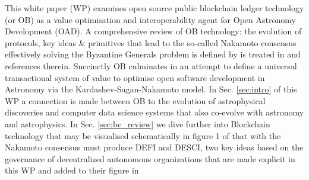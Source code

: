 \documentclass[final,5p,times,twocolumn,authoryear]{elsarticle}
\begin{document}
This white paper (WP) examines open source public blockchain ledger technology (or OB) as a value optimisation and interoperability agent for Open Astronomy Development (OAD). A comprehensive review of OB technology: the evolution of protocols, key ideas \& primitives that lead to the so-called Nakamoto consensus effectively solving the Byzantine Generals problem is defined by \cite{Lamport1982TheBG} is treated in  \cite{arvindandclark2017} and references therein. Succinctly OB culminates in an attempt to define a universal transactional system of value to optimise open software development in Astronomy via the Kardashev-Sagan-Nakamoto model. In Sec. \ref{sec:intro} of this WP a connection is made between OB to the evolution of astrophysical discoveries and computer data science systems that also co-evolve with astronomy and astrophysics. In Sec. \ref{sec:bc_review} we dive further into Blockchain technology that may be visualised schematically in figure 1 of \cite{arvindandclark2017} that with the Nakamoto consensus must produce DEFI and DESCI, two key ideas based on the governance of decentralized autonomous organizations that are made explicit in this WP and added to their figure in
\end{document}
